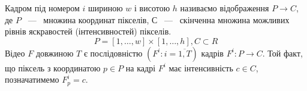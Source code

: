 Кадром під номером $i$ шириною $w$ і висотою $h$ називаємо відображення
$P \to C$, де $P$ ~---~ множина координат пікселів, $С$ ~---~ скінченна множина можливих рівнів
яскравостей (інтенсивностей) пікселів.
\begin{equation*}
    P = [1, \ldots ,w]\times[1, \ldots, h], C \subset R
\end{equation*}
Відео \(F\) довжиною \(T\)
є послідовністю \(\left( F^{i}:i = \overline{1,T} \right)\) кадрів
\(F^{i}:P \rightarrow C\). Той факт, що піксель з координатою
\(p \in P\) на кадрі \(F^{i}\) має інтенсивність \(c \in C\),
позначатимемо \(F_{p}^{i} = c\).

\clearpage